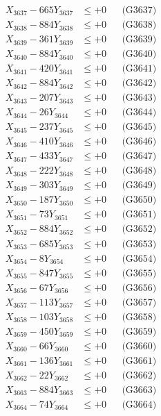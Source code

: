 \documentclass[a4paper,10pt]{article}
\begin{document}
{\begin{align}
X_{3637} - 665Y_{3637} &\leq +0 && \text{(G3637)} \\
X_{3638} - 884Y_{3638} &\leq +0 && \text{(G3638)} \\
X_{3639} - 361Y_{3639} &\leq +0 && \text{(G3639)} \\
X_{3640} - 884Y_{3640} &\leq +0 && \text{(G3640)} \\
\allowbreak
X_{3641} - 420Y_{3641} &\leq +0 && \text{(G3641)} \\
X_{3642} - 884Y_{3642} &\leq +0 && \text{(G3642)} \\
X_{3643} - 207Y_{3643} &\leq +0 && \text{(G3643)} \\
X_{3644} - 26Y_{3644} &\leq +0 && \text{(G3644)} \\
X_{3645} - 237Y_{3645} &\leq +0 && \text{(G3645)} \\
X_{3646} - 410Y_{3646} &\leq +0 && \text{(G3646)} \\
X_{3647} - 433Y_{3647} &\leq +0 && \text{(G3647)} \\
X_{3648} - 222Y_{3648} &\leq +0 && \text{(G3648)} \\
X_{3649} - 303Y_{3649} &\leq +0 && \text{(G3649)} \\
X_{3650} - 187Y_{3650} &\leq +0 && \text{(G3650)} \\
\allowbreak
X_{3651} - 73Y_{3651} &\leq +0 && \text{(G3651)} \\
X_{3652} - 884Y_{3652} &\leq +0 && \text{(G3652)} \\
X_{3653} - 685Y_{3653} &\leq +0 && \text{(G3653)} \\
X_{3654} - 8Y_{3654} &\leq +0 && \text{(G3654)} \\
X_{3655} - 847Y_{3655} &\leq +0 && \text{(G3655)} \\
X_{3656} - 67Y_{3656} &\leq +0 && \text{(G3656)} \\
X_{3657} - 113Y_{3657} &\leq +0 && \text{(G3657)} \\
X_{3658} - 103Y_{3658} &\leq +0 && \text{(G3658)} \\
X_{3659} - 450Y_{3659} &\leq +0 && \text{(G3659)} \\
X_{3660} - 66Y_{3660} &\leq +0 && \text{(G3660)} \\
\allowbreak
X_{3661} - 136Y_{3661} &\leq +0 && \text{(G3661)} \\
X_{3662} - 22Y_{3662} &\leq +0 && \text{(G3662)} \\
X_{3663} - 884Y_{3663} &\leq +0 && \text{(G3663)} \\
X_{3664} - 74Y_{3664} &\leq +0 && \text{(G3664)} \\

\end{align}}
\end{document}
